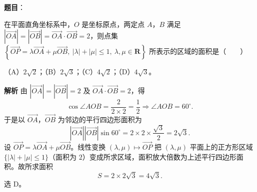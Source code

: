 \begin{answer}

\textbf{题目}：

在平面直角坐标系中，$O$ 是坐标原点，两定点 $A$，$B$ 满足 $|\overrightarrow{OA}|=|\overrightarrow{OB}|=\overrightarrow{OA}\cdot\overrightarrow{OB}=2$，则点集 $\left\{\overrightarrow{OP}=\lambda\overrightarrow{OA}+\mu\overrightarrow{OB},\ |\lambda|+|\mu|\leqslant1,\ \lambda,\mu\in\mathbf R\right\}$ 所表示的区域的面积是\mbox{（　　）}

（A）$2\sqrt2$；（B）$2\sqrt3$；（C）$4\sqrt2$；（D）$4\sqrt3$。

\textbf{解析}
由 $|\overrightarrow{OA}|=|\overrightarrow{OB}|=2$ 及 $\overrightarrow{OA}\cdot\overrightarrow{OB}=2$，得
\nopagebreak[4]
\[\cos\angle AOB=\frac{2}{2\times2}=\frac12\Longrightarrow \angle AOB=60^\circ.\]
于是以 $\overrightarrow{OA}$，$\overrightarrow{OB}$ 为邻边的平行四边形面积为
\nopagebreak[4]
\[|\overrightarrow{OA}||\overrightarrow{OB}|\sin60^\circ=2\times2\times\frac{\sqrt3}{2}=2\sqrt3.\]
设 $\overrightarrow{OP}=\lambda\overrightarrow{OA}+\mu\overrightarrow{OB}$。线性变换 $(\lambda,\mu)\mapsto\overrightarrow{OP}$ 把 $(\lambda,\mu)$ 平面上的正方形区域 $\{|\lambda|+|\mu|\leqslant1\}$（面积为 $2$）变成所求区域，面积放大倍数为上述平行四边形面积。故所求面积
\nopagebreak[4]
\[S=2\times2\sqrt3=4\sqrt3.\]
选 D。


\end{answer}
